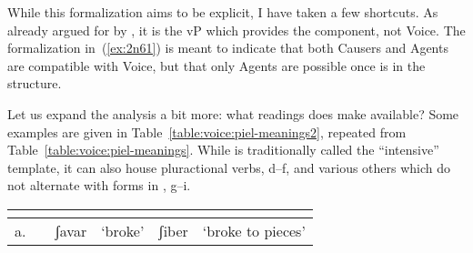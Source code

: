 \begin{exe}
\begin{xlist}
\begin{exe}
\begin{xlist}
\begin{exe}
\begin{xlist}
\begin{exe}
\begin{exe}
\begin{xlist}
\begin{exe}
\begin{xlist}
\begin{exe}
\begin{xlist}
\begin{exe}
\begin{xlist}
\begin{exe}
\begin{xlist}
\begin{exe}
\begin{xlist}
\begin{exe}
\begin{xlist}
\begin{exe}
\begin{xlist}
\begin{exe}
\begin{xlist}
\begin{exe}
\begin{xlist}
\begin{exe}
\begin{xlist}
\begin{exe}
\begin{xlist}
\begin{exe}
\begin{exe}
\begin{xlist}
\begin{exe}
\begin{xlist}
\begin{exe}
\begin{xlist}
\begin{exe}
\begin{xlist}
{\begin{exe}
\begin{xlist}
\begin{exe}
\begin{xlist}
\begin{exe}
\begin{xlist}
\begin{exe}
\begin{xlist}
\begin{xlist}
\begin{xlist}
\begin{exe}
\begin{xlist}
\begin{xlist}
\begin{xlist}
\begin{exe}
\begin{exe}
\begin{xlist}
\begin{exe}
\begin{xlist}
\begin{exe}
\begin{xlist}
\begin{exe}
\begin{xlist}
\begin{exe}
\begin{xlist}
\begin{exe}
\begin{xlist}
\begin{exe}
\begin{exe}
\begin{xlist}
\begin{xlist}
\begin{exe}
\begin{xlist}
\begin{exe}
\begin{xlist}
\begin{exe}
\begin{xlist}
\begin{exe}
\begin{xlist}
\begin{exe}
\begin{xlist}
\begin{exe}
\begin{xlist}
\begin{exe}
\begin{exe}
\begin{xlist}
\begin{exe}
\begin{xlist}
\begin{exe}
\begin{xlist}
\begin{exe}
\begin{xlist}
While this formalization aims to be explicit, I have taken a few shortcuts. As already argued for by \cite{layering15}, it is the vP which provides the  component, not Voice. The formalization in~(\ref{ex:2n61}) is meant to indicate that both Causers and Agents are compatible with Voice, but that only Agents are possible once {\va} is in the structure. 

Let us expand the analysis a bit more: what readings does {\va} make available? Some examples are given in Table~\ref{table:voice:piel-meanings2}, repeated from Table~\ref{table:voice:piel-meanings}. While {\tpie} is traditionally called the ``intensive'' template, it can also house pluractional verbs, d--f, and various others which do not alternate with forms in {\tkal}, g--i.
\begin{table}
	\begin{tabularx}{\textwidth}{llllll}
		\lsptoprule
		& & \multicolumn{2}{c}{\tkal} &  \multicolumn{2}{c}{\tpie}\\\midrule
		a.& \root{ʃbr} & ʃavar & `broke' & ʃiber & `broke to pieces'\\

\end{tabularx}
\end{table}
\end{xlist}
\end{exe}
\end{xlist}
\end{exe}
\end{xlist}
\end{exe}
\end{xlist}
\end{exe}
\end{exe}
\end{xlist}
\end{exe}
\end{xlist}
\end{exe}
\end{xlist}
\end{exe}
\end{xlist}
\end{exe}
\end{xlist}
\end{exe}
\end{xlist}
\end{exe}
\end{xlist}
\end{xlist}
\end{exe}
\end{exe}
\end{xlist}
\end{exe}
\end{xlist}
\end{exe}
\end{xlist}
\end{exe}
\end{xlist}
\end{exe}
\end{xlist}
\end{exe}
\end{xlist}
\end{exe}
\end{exe}
\end{xlist}
\end{xlist}
\end{xlist}
\end{exe}
\end{xlist}
\end{xlist}
\end{xlist}
\end{exe}
\end{xlist}
\end{exe}
\end{xlist}
\end{exe}
\end{xlist}
\end{exe}}
\end{xlist}
\end{exe}
\end{xlist}
\end{exe}
\end{xlist}
\end{exe}
\end{xlist}
\end{exe}
\end{exe}
\end{xlist}
\end{exe}
\end{xlist}
\end{exe}
\end{xlist}
\end{exe}
\end{xlist}
\end{exe}
\end{xlist}
\end{exe}
\end{xlist}
\end{exe}
\end{xlist}
\end{exe}
\end{xlist}
\end{exe}
\end{xlist}
\end{exe}
\end{xlist}
\end{exe}
\end{xlist}
\end{exe}
\end{xlist}
\end{exe}
\end{exe}
\end{xlist}
\end{exe}
\end{xlist}
\end{exe}
\end{xlist}
\end{exe}
